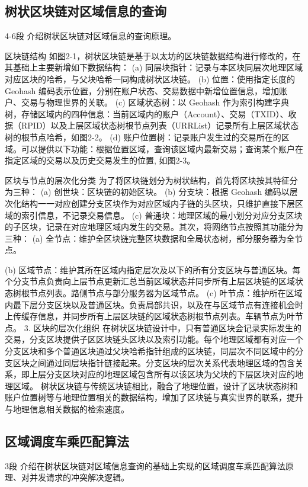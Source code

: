 \subsection{树状区块链对区域信息的查询}4-6段
介绍树状区块链对区域信息的查询原理。

区块链结构
如图2-1，树状区块链是基于以太坊的区块链数据结构进行修改的，在其基础上主要新增如下数据结构：
(a) 同层块指针：记录与本区块同层次地理区域对应区块的哈希，与父块哈希一同构成树状区块链。
(b) 位置：使用指定长度的 Geohash 编码表示位置，分别在账户状态、交易数据中新增位置信息，增加账户、交易与物理世界的关联。
(c) 区域状态树：以 Geohash 作为索引构建字典树，存储区域内的四种信息：当前区域内的账户（Account）、交易（TXID）、收据（RPID）以及上层区域状态树根节点列表（URRList）记录所有上层区域状态树的根节点哈希，如图2-2。
(d) 账户位置树：记录账户发生过的交易所在的区域。可以提供以下功能：根据位置区域，查询该区域内最新交易；查询某个账户在指定区域的交易以及历史交易发生的位置, 如图2-3。

区块与节点的层次化分类
为了将区块链划分为树状结构，首先将区块按其特征分为三种：
(a) 创世块：区块链的初始区块。
(b) 分支块：根据 Geohash 编码以层次化结构一一对应创建分支区块作为对应区域内子链的头区块，只维护直接下层区域的索引信息，不记录交易信息。
(c) 普通块：地理区域的最小划分对应分支区块的子区块，记录在对应地理区域内发生的交易。其次，将网络节点按照其功能分为三种：
(a) 全节点：维护全区块链完整区块数据和全局状态树，部分服务器为全节点。

(b) 区域节点：维护其所在区域内指定层次及以下的所有分支区块与普通区块。每个分支节点负责向上层节点更新汇总当前区域状态并同步所有上层区块链的区域状态树根节点列表。路侧节点与部分服务器为区域节点。
(c) 叶节点：维护所在区域内最下层分支区块以及普通区块。负责局部共识，以及在与区域节点有连接机会时上传缓存信息，并同步所有上层区块链的区域状态树根节点列表。车辆节点为叶节点。
3. 区块的层次化组织
在树状区块链设计中，只有普通区块会记录实际发生的交易，分支区块提供子区区块链头区块以及索引功能。每个地理区域都有对应一个分支区块和多个普通区块通过父块哈希指针组成的区块链，同层次不同区域中的分支区块之间通过同层块指针链接起来。分支区块的层次关系代表地理区域的包含关系，即上层分支区块对应的地理区域包含所有以该区块为父块的下层区块对应的地理区域。
树状区块链与传统区块链相比，融合了地理位置，设计了区块状态树和账户位置树等与地理位置相关的数据结构，增加了区块链与真实世界的联系，提升与地理信息相关数据的检索速度。

\subsection{区域调度车乘匹配算法}3段
介绍在树状区块链对区域信息查询的基础上实现的区域调度车乘匹配算法原理、对并发请求的冲突解决逻辑。

